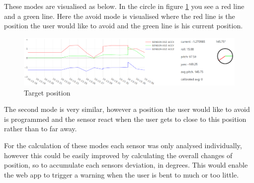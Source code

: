These modes are visualised as below. In the circle in figure \ref{fig:TargetPosition} you see a red line and a green line. Here the avoid mode is visualised where the red line is the position the user would like to avoid and the green line is his current position.

\begin{figure}[ht]
  \begin{center}
\includegraphics[width=\textwidth]{images/WebAppCircle.png}
  \end{center}
  \caption{Target position}
  \label{fig:TargetPosition}
\end{figure}

The second mode is very similar, however a position the user would like to avoid is programmed and the sensor react when the user gets to close to this position rather than to far away. 

For the calculation of these modes each sensor was only analysed individually, however this could be easily improved by calculating the overall changes of position, so to accumulate each sensors deviation, in degrees. This would enable the web app to trigger a warning when the user is bent to much or too little.